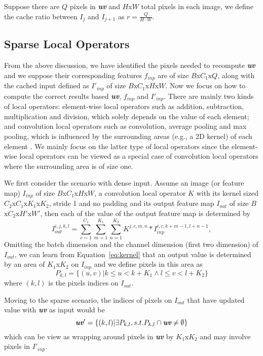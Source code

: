 Suppose there are $Q$ pixels in \textit{\textbf{uv}} and $H$x$W$ total pixels in each image,
we define the cache ratio between $I_j$ and $I_{j+1}$ as $r = \frac{Q}{H\cdot W}$.

\subsection{Sparse Local Operators}
From the above discussion, we have identified the pixels needed to recompute \textit{\textbf{uv}} and we suppose their corresponding features $f_{inp}$ are of size $B$x$C_1$x$Q$, along with the cached input defined as $I'_{inp}$ of size $B$x$C_1$x$H$x$W$.
Now we focus on how to compute the correct results based \textit{\textbf{uv}}, $f_{inp}$ and $I'_{inp}$.
There are mainly two kinds of local operators: element-wise local operators such as addition, subtraction, multiplication and division, which solely depends on the value of each element; and convolution local operators such as convolution, average pooling and max pooling, which is influenced by the surrounding areas (e.g., a 2D kernel) of each element .
We mainly focus on the latter type of local operators since the element-wise local operators can be viewed as a special case of convolution local operators where the surrounding area is of size one.

We first consider the scenario with dense input.
Assume an image (or feature map) $I_{inp}$ of size $B$x$C_1$x$H$x$W$, a convolution local operator $K$ with its kernel sized $C_2$x$C_1$x$K_1$x$K_2$, stride 1 and no padding and its output feature map $I_{out}$ of size $B$x$C_2$x$H'$x$W'$, then each of the value of the output feature map is determined by
\begin{equation}
    I_{out}^{i,j,k,l} = \sum_{c=1}^{C_1} \sum_{m=1}^{K_1} \sum_{n=1}^{K_2} K^{j,c,m,n} * I_{inp}^{i,c,k+m-1,l+n-1}, 
    \label{eq:kernel}
\end{equation}
Omitting the batch dimension and the channel dimension (first two dimension) of $I_{out}$, we can learn from Equation~\ref{eq:kernel} that an output value is determined by an area of $K_1$x$K_2$ on $I_{inp}$ and we define pixels in this area as
\begin{equation}
    P_{k,l} = \{(u,v)|k\leq u < k+K_1 \land l\leq v < l+K_2\}
    \label{eq:set}
\end{equation}
where $(k,l)$ is the pixels indices on $I_{out}$.

Moving to the sparse scenario, 
the indices of pixels on $I_{out}$ that have updated value with \textit{\textbf{uv}} as input would be 
\begin{equation}
\textit{\textbf{uv}}' = \{(k,l)|\exists P_{k,l}, s.t. P_{k,l}\cap \textit{\textbf{uv}} \neq \emptyset\}
\end{equation} 
which can be view as wrapping around pixels in \textit{\textbf{uv}} by $K_1$x$K_2$ and may involve pixels in $I'_{inp}$.


